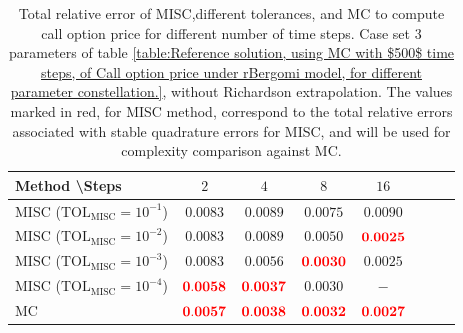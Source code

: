 \FloatBarrier

\begin{table}[h!]
	\centering
	\begin{tabular}{l*{6}{c}r}
		Method \textbackslash  Steps            & $2$ & $4$ & $8$ & $16$  \\
		\hline
		MISC ($\text{TOL}_{\text{MISC}}=10^{-1}$)  &  $\mathbf{0.0083}$ & $\mathbf{0.0089}$& $\mathbf{ 0.0075}$ & $\mathbf{ 0.0090}$   \\
		MISC ($\text{TOL}_{\text{MISC}}=10^{-2}$)  &  $\mathbf{0.0083}$ & $\mathbf{0.0089}$& $\mathbf{ 0.0050}$ & $\mathbf{ {\color{red}0.0025}}$  \\
		MISC ($\text{TOL}_{\text{MISC}}=10^{-3}$)  &  $\mathbf{0.0083}$& $\mathbf{0.0056}$& $\mathbf{{\color{red}0.0030}}$  & $\mathbf{ 0.0025}$  \\
		MISC ($\text{TOL}_{\text{MISC}}=10^{-4}$)  &  $\mathbf{{\color{red}0.0058}}$ & $\mathbf{{\color{red}0.0037}}$& $\mathbf{0.0030}$ & $\mathbf{ -}$ \\
		
		\hline
		MC    & $\mathbf{{\color{red}0.0057}}$  & $\mathbf{ {\color{red}0.0038}}$  & $\mathbf{{\color{red}0.0032}}$ & $\mathbf{ {\color{red}0.0027}}$  \\		
		\hline
	\end{tabular}
	\caption{Total relative error of MISC,different tolerances, and MC to compute call option price  for different number of time steps. Case set $3$ parameters of table \ref{table:Reference solution, using MC with $500$ time steps, of Call option price under rBergomi model, for different parameter constellation.}, without Richardson extrapolation.  The values marked in red, for MISC method, correspond to the total relative errors associated with  stable quadrature errors for MISC, and will be used for complexity comparison against MC.}
	\label{Total error of MISC and MC to compute Call option price of the different tolerances for different number of time steps. Case set 4, without Richardson extrapolation. The numbers between parentheses are the corresponding absolute errors.}
\end{table}

